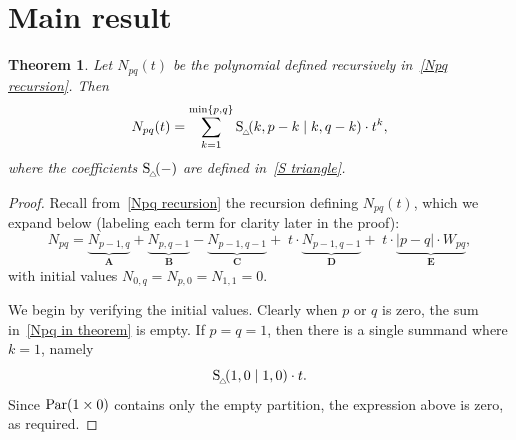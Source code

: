 \documentclass[11pt]{amsart}
\theoremstyle{plain}
\newtheorem{theorem}{Theorem}[section]
\theoremstyle{definition}
\numberwithin{equation}{section}
\newcommand{\Par}{{\rm Par}}
\newcommand{\Stri}{{\rm S}_{_{\!\triangle\!\!}}}
\begin{document}
\section{Main result}
\label{sec:main result}

\begin{theorem}
    \label{thm:main result}
    Let $N_{pq}(t)$ be the polynomial defined recursively in~\eqref{Npq recursion}.
    Then
    \begin{equation}
    \label{Npq in theorem}
        N_{pq}(t) = \sum_{k=1}^{\min\{p,q\}} \Stri(k, p-k \mid k, q-k) \cdot t^k,
    \end{equation}
    where the coefficients $\Stri( - )$ are defined in~\eqref{S triangle}.
\end{theorem}

\begin{proof}
    Recall from~\eqref{Npq recursion} the recursion defining $N_{pq}(t)$, which we expand below (labeling each term for clarity later in the proof):
    \begin{equation}
        \label{Npq expanded}
        N_{pq} = \underbrace{N_{p-1,q}}_{\mathbf A} + \underbrace{N_{p,q-1}}_{\mathbf B} - \underbrace{N_{p-1, q-1}}_{\mathbf C} + \; t \cdot \underbrace{N_{p-1,q-1}}_{\mathbf D} + \; t \cdot \underbrace{|p-q| \cdot W_{pq}}_{\mathbf E},
    \end{equation}
    with initial values $N_{0,q} = N_{p,0} = N_{1,1} = 0$.
    
    We begin by verifying the initial values.
    Clearly when $p$ or $q$ is zero, the sum in~\eqref{Npq in theorem} is empty.
    If $p=q=1$, then there is a single summand where $k=1$, namely
    \[
        \Stri(1,0 \mid 1,0) \cdot t.
    \]
    Since $\Par(1 \times 0)$ contains only the empty partition, the expression above is zero, as required.


\end{proof}
\end{document}
